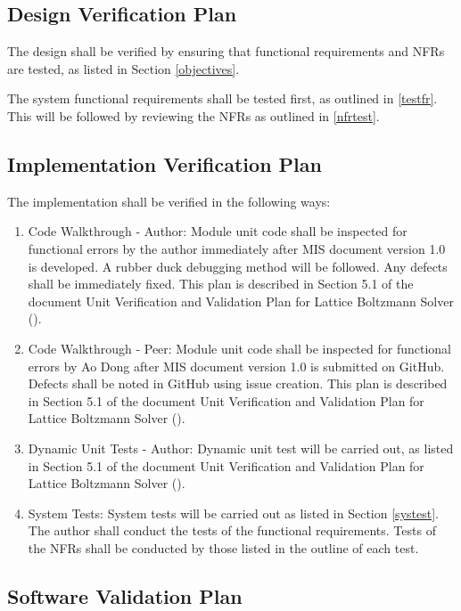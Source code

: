 \documentclass[12pt, titlepage]{article}
\begin{document}
\subsection{Design Verification Plan}

The design shall be verified by ensuring that functional requirements and NFRs
are tested, as listed in Section \ref{objectives}.

\noindent The system functional requirements shall be tested first, as outlined
in \ref{testfr}. This will be followed by reviewing the NFRs as outlined in
\ref{nfrtest}.

\subsection{Implementation Verification Plan}
  
\noindent The implementation shall be verified in the following ways:

\begin{enumerate}
\item Code Walkthrough - Author: Module unit code shall be inspected for
  functional errors by the author immediately after MIS document version 1.0 is
  developed. A rubber duck debugging method will be followed. Any defects shall
  be immediately fixed. This plan is described in Section 5.1 of the document
  Unit Verification and Validation Plan for Lattice Boltzmann Solver
  (\citet{LBM_UVNV_PM}).
\item Code Walkthrough - Peer: Module unit code shall be inspected for
  functional errors by Ao Dong after MIS document version 1.0 is submitted on
  GitHub. Defects shall be noted in GitHub using issue creation. This plan is
  described in Section 5.1 of the document Unit Verification and Validation Plan
  for Lattice Boltzmann Solver (\citet{LBM_UVNV_PM}).
\item Dynamic Unit Tests - Author: Dynamic unit test will be carried out, as
  listed in Section 5.1 of the document Unit Verification and Validation Plan
  for Lattice Boltzmann Solver (\citet{LBM_UVNV_PM}).
\item System Tests: System tests will be carried out as listed in Section
  \ref{systest}. The author shall conduct the tests of the functional
  requirements. Tests of the NFRs shall be conducted by those listed in the
  outline of each test.
\end{enumerate}

\subsection{Software Validation Plan}
\end{document}
